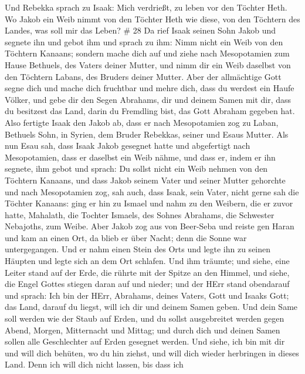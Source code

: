  Und Rebekka sprach zu Isaak: Mich verdrießt, zu leben vor
den Töchter Heth. Wo Jakob ein Weib nimmt von den Töchter Heth wie
diese, von den Töchtern des Landes, was soll mir das Leben? \# 28
 Da rief Isaak seinen Sohn Jakob und segnete ihn und gebot
ihm und sprach zu ihm: Nimm nicht ein Weib von den Töchtern Kanaans;
 sondern mache dich auf und ziehe nach Mesopotamien zum
Hause Bethuels, des Vaters deiner Mutter, und nimm dir ein Weib daselbst
von den Töchtern Labans, des Bruders deiner Mutter.  Aber
der allmächtige Gott segne dich und mache dich fruchtbar und mehre dich,
dass du werdest ein Haufe Völker,  und gebe dir den Segen
Abrahams, dir und deinem Samen mit dir, dass du besitzest das Land,
darin du Fremdling bist, das Gott Abraham gegeben hat.  Also
fertigte Isaak den Jakob ab, dass er nach Mesopotamien zog zu Laban,
Bethuels Sohn, in Syrien, dem Bruder Rebekkas, seiner und Esaus Mutter.
 Als nun Esau sah, dass Isaak Jakob gesegnet hatte und
abgefertigt nach Mesopotamien, dass er daselbst ein Weib nähme, und dass
er, indem er ihn segnete, ihm gebot und sprach: Du sollst nicht ein Weib
nehmen von den Töchtern Kanaans,  und dass Jakob seinem
Vater und seiner Mutter gehorchte und nach Mesopotamien zog,
 sah auch, dass Isaak, sein Vater, nicht gerne sah die
Töchter Kanaans:  ging er hin zu Ismael und nahm zu den
Weibern, die er zuvor hatte, Mahalath, die Tochter Ismaels, des Sohnes
Abrahams, die Schwester Nebajoths, zum Weibe.  Aber Jakob
zog aus von Beer-Seba und reiste gen Haran  und kam an
einen Ort, da blieb er über Nacht; denn die Sonne war untergegangen. Und
er nahm einen Stein des Orts und legte ihn zu seinen Häupten und legte
sich an dem Ort schlafen.  Und ihm träumte; und siehe, eine
Leiter stand auf der Erde, die rührte mit der Spitze an den Himmel, und
siehe, die Engel Gottes stiegen daran auf und nieder;  und
der HErr stand obendarauf und sprach: Ich bin der HErr, Abrahams, deines
Vaters, Gott und Isaaks Gott; das Land, darauf du liegst, will ich dir
und deinem Samen geben.  Und dein Same soll werden wie der
Staub auf Erden, und du sollst ausgebreitet werden gegen Abend, Morgen,
Mitternacht und Mittag; und durch dich und deinen Samen sollen alle
Geschlechter auf Erden gesegnet werden.  Und siehe, ich bin
mit dir und will dich behüten, wo du hin ziehst, und will dich wieder
herbringen in dieses Land. Denn ich will dich nicht lassen, bis dass ich
